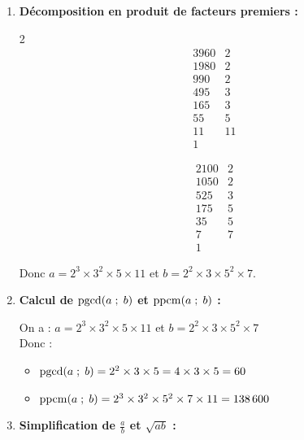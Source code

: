 \documentclass[10pt, a4paper]{article}
\begin{document}
\begin{Solution}[APPLICATION][12]
\begin{enumerate}[leftmargin=*,itemsep=0.5pt]
    \item \textbf{Décomposition en produit de facteurs premiers :}

    \begin{multicols}{2}
    \[
    \begin{array}{r|l}
    3960 & 2 \\
    1980 & 2 \\
    990  & 2 \\
    495  & 3 \\
    165  & 3 \\
    55   & 5 \\
    11   & 11 \\
    1    &
    \end{array}
    \]

    \columnbreak

    \[
    \begin{array}{r|l}
    2100 & 2 \\
    1050 & 2 \\
    525  & 3 \\
    175  & 5 \\
    35   & 5 \\
    7    & 7 \\
    1    &
    \end{array}
    \]

    \end{multicols}
        Donc $a = 2^3 \times 3^2 \times 5 \times 11$ \quad et \quad $b = 2^2 \times 3 \times 5^2 \times 7$.

    \item \textbf{Calcul de $\operatorname{pgcd}(a \; ; \; b)$ et $\operatorname{ppcm}(a \; ; \; b)$ :}

    On a : $a = 2^3 \times 3^2 \times 5 \times 11$ \quad et \quad $b = 2^2 \times 3 \times 5^2 \times 7$ \\
    Donc : 
    \begin{itemize}[leftmargin=*,itemsep=0.5pt]
        \item $\operatorname{pgcd}(a \; ; \; b) = 2^2 \times 3 \times 5 = 4 \times 3 \times 5 = 60$

        \item $\operatorname{ppcm}(a \; ; \; b) = 2^3 \times 3^2 \times 5^2 \times 7 \times 11 = 138\,600$
    \end{itemize}    

    \item \textbf{Simplification de $\frac{a}{b}$ et $\sqrt{ab}$ :}


\end{enumerate}
\end{Solution}
\end{document}
